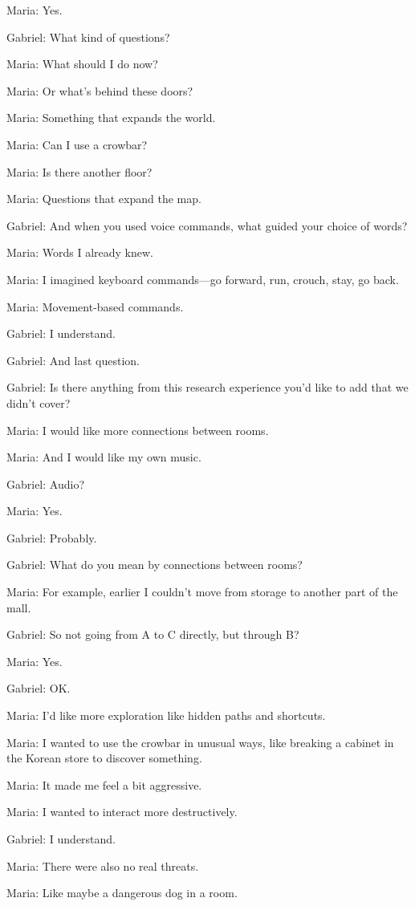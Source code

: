 Maria: Yes.

Gabriel: What kind of questions?

Maria: What should I do now?

Maria: Or what’s behind these doors?

Maria: Something that expands the world.

Maria: Can I use a crowbar?

Maria: Is there another floor?

Maria: Questions that expand the map.

Gabriel: And when you used voice commands, what guided your choice of words?

Maria: Words I already knew.

Maria: I imagined keyboard commands—go forward, run, crouch, stay, go back.

Maria: Movement-based commands.

Gabriel: I understand.

Gabriel: And last question.

Gabriel: Is there anything from this research experience you’d like to add that we didn’t cover?

Maria: I would like more connections between rooms.

Maria: And I would like my own music.

Gabriel: Audio?

Maria: Yes.

Gabriel: Probably.

Gabriel: What do you mean by connections between rooms?

Maria: For example, earlier I couldn’t move from storage to another part of the mall.

Gabriel: So not going from A to C directly, but through B?

Maria: Yes.

Gabriel: OK.

Maria: I’d like more exploration like hidden paths and shortcuts.

Maria: I wanted to use the crowbar in unusual ways, like breaking a cabinet in the Korean store to discover something.

Maria: It made me feel a bit aggressive.

Maria: I wanted to interact more destructively.

Gabriel: I understand.

Maria: There were also no real threats.

Maria: Like maybe a dangerous dog in a room.

